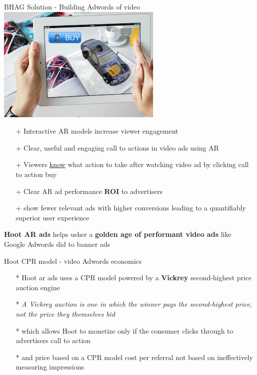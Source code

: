 \documentclass[12pt]{beamer}
\begin{document}
\begin{frame}[fragile]{BHAG Solution -  Building Adwords of video \includegraphics[scale=.1]{static/arad/arad5} }
\begin{itemize}
\item[+]Interactive AR models increase viewer engagement
\pause	
\item[+]Clear, useful and engaging call to actions in video ads using AR
\pause
\item[+]Viewers \underline{know} what action to take after watching video ad by clicking call to action buy 
\pause
\item[+]Clear AR ad performance \textbf{ROI} to advertisers 
\pause
\item[+]show fewer relevant ads with higher conversions leading to a quantifiably superior user experience 
\pause
\end{itemize}
\textbf{Hoot AR ads} helps usher a \textbf{golden age of performant video ads }like Google Adwords did to banner ads


\end{frame}

\begin{frame}[t]{Hoot CPR model - video Adwords economics}
\begin{itemize}
\item[*]Hoot ar ads uses a CPR model powered by a \textbf{Vickrey} second-highest price auction engine
\pause
\item[*]\emph{A Vickrey auction is one in which the winner pays the second-highest price, not the price they themselves bid}
\pause
\item[*]which allows Hoot to monetize only if the consumer clicks through to advertisers call to action
\pause
\item[*]and price based on a CPR model cost per referral not based on ineffectively measuring impressions
\end{itemize}
\end{frame}
\end{document}
